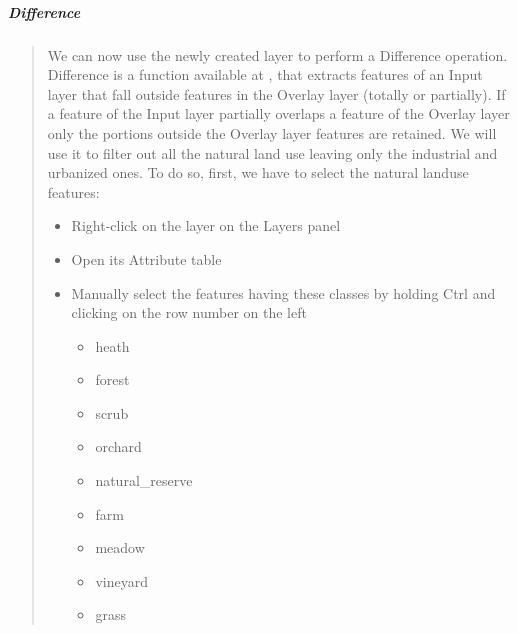 \documentclass[letterpaper,10pt,english]{sphinxmanual}
\begin{document}
\subparagraph{Difference}
\label{\detokenize{vector/overlay:difference}}\begin{quote}

We can now use the newly created  layer to perform a Difference operation. Difference is a function available at
, that extracts features of an Input layer that fall outside features in the Overlay layer
(totally or partially). If a feature of the Input layer partially overlaps a feature of the Overlay layer only the portions outside
the Overlay layer features are retained. We will use it to filter out all the natural land use leaving only the industrial and urbanized ones.
To do so, first, we have to select the natural landuse features:
\begin{itemize}
\item {} 
Right-click on the  layer on the Layers panel

\item {} 
Open its Attribute table

\item {} 
Manually select the features having these classes by holding Ctrl and clicking on the row number on the left
\begin{itemize}
\item {} 
heath

\item {} 
forest

\item {} 
scrub

\item {} 
orchard

\item {} 
natural\_reserve

\item {} 
farm

\item {} 
meadow

\item {} 
vineyard

\item {} 
grass

\end{itemize}

\end{itemize}

\noindent{}


\end{quote}
\end{document}
